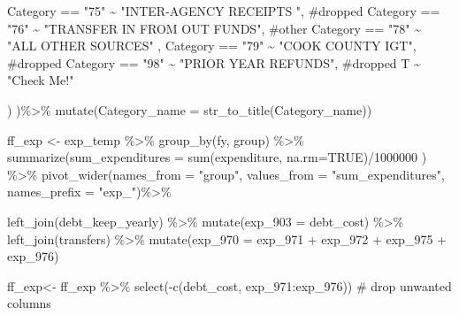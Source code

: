 \documentclass[
  letterpaper,
  DIV=11,
  numbers=noendperiod]{scrreport}
\newenvironment{Shaded}{\begin{snugshade}}{\end{snugshade}}
\newcommand{\AttributeTok}[1]{\textcolor[rgb]{0.40,0.45,0.13}{#1}}
\newcommand{\CommentTok}[1]{\textcolor[rgb]{0.37,0.37,0.37}{#1}}
\newcommand{\ConstantTok}[1]{\textcolor[rgb]{0.56,0.35,0.01}{#1}}
\newcommand{\DecValTok}[1]{\textcolor[rgb]{0.68,0.00,0.00}{#1}}
\newcommand{\FunctionTok}[1]{\textcolor[rgb]{0.28,0.35,0.67}{#1}}
\newcommand{\NormalTok}[1]{\textcolor[rgb]{0.00,0.23,0.31}{#1}}
\newcommand{\OtherTok}[1]{\textcolor[rgb]{0.00,0.23,0.31}{#1}}
\newcommand{\SpecialCharTok}[1]{\textcolor[rgb]{0.37,0.37,0.37}{#1}}
\newcommand{\StringTok}[1]{\textcolor[rgb]{0.13,0.47,0.30}{#1}}
\begin{document}
\begin{Shaded}
\begin{Highlighting}[]
\NormalTok{    Category }\SpecialCharTok{==} \StringTok{"75"} \SpecialCharTok{\textasciitilde{}}  \StringTok{"INTER{-}AGENCY RECEIPTS "}\NormalTok{,  }\CommentTok{\#dropped}
\NormalTok{    Category }\SpecialCharTok{==} \StringTok{"76"} \SpecialCharTok{\textasciitilde{}}  \StringTok{"TRANSFER IN FROM OUT FUNDS"}\NormalTok{,  }\CommentTok{\#other}
\NormalTok{    Category }\SpecialCharTok{==} \StringTok{"78"} \SpecialCharTok{\textasciitilde{}}  \StringTok{"ALL OTHER SOURCES"}\NormalTok{ ,}
\NormalTok{    Category }\SpecialCharTok{==} \StringTok{"79"} \SpecialCharTok{\textasciitilde{}}   \StringTok{"COOK COUNTY IGT"}\NormalTok{, }\CommentTok{\#dropped}
\NormalTok{    Category }\SpecialCharTok{==} \StringTok{"98"} \SpecialCharTok{\textasciitilde{}}  \StringTok{"PRIOR YEAR REFUNDS"}\NormalTok{, }\CommentTok{\#dropped}
\NormalTok{                 T }\SpecialCharTok{\textasciitilde{}} \StringTok{"Check Me!"}

\NormalTok{  ) )}\SpecialCharTok{\%\textgreater{}\%} 
  \FunctionTok{mutate}\NormalTok{(}\AttributeTok{Category\_name =} \FunctionTok{str\_to\_title}\NormalTok{(Category\_name))}



\NormalTok{ff\_exp }\OtherTok{\textless{}{-}}\NormalTok{ exp\_temp }\SpecialCharTok{\%\textgreater{}\%} 
  \FunctionTok{group\_by}\NormalTok{(fy, group) }\SpecialCharTok{\%\textgreater{}\%} 
  \FunctionTok{summarize}\NormalTok{(}\AttributeTok{sum\_expenditures =} \FunctionTok{sum}\NormalTok{(expenditure, }\AttributeTok{na.rm=}\ConstantTok{TRUE}\NormalTok{)}\SpecialCharTok{/}\DecValTok{1000000}\NormalTok{ ) }\SpecialCharTok{\%\textgreater{}\%}
  \FunctionTok{pivot\_wider}\NormalTok{(}\AttributeTok{names\_from =} \StringTok{"group"}\NormalTok{, }\AttributeTok{values\_from =} \StringTok{"sum\_expenditures"}\NormalTok{, }\AttributeTok{names\_prefix =} \StringTok{"exp\_"}\NormalTok{)}\SpecialCharTok{\%\textgreater{}\%}
  
    \FunctionTok{left\_join}\NormalTok{(debt\_keep\_yearly) }\SpecialCharTok{\%\textgreater{}\%}
  \FunctionTok{mutate}\NormalTok{(}\AttributeTok{exp\_903 =}\NormalTok{ debt\_cost) }\SpecialCharTok{\%\textgreater{}\%}
  \FunctionTok{left\_join}\NormalTok{(transfers) }\SpecialCharTok{\%\textgreater{}\%}
  \FunctionTok{mutate}\NormalTok{(}\AttributeTok{exp\_970 =}\NormalTok{ exp\_971 }\SpecialCharTok{+}\NormalTok{ exp\_972  }\SpecialCharTok{+}\NormalTok{ exp\_975 }\SpecialCharTok{+}\NormalTok{ exp\_976)}

\NormalTok{ff\_exp}\OtherTok{\textless{}{-}}\NormalTok{ ff\_exp }\SpecialCharTok{\%\textgreater{}\%} \FunctionTok{select}\NormalTok{(}\SpecialCharTok{{-}}\FunctionTok{c}\NormalTok{(debt\_cost, exp\_971}\SpecialCharTok{:}\NormalTok{exp\_976)) }\CommentTok{\# drop unwanted columns}


\end{Highlighting}
\end{Shaded}
\end{document}
